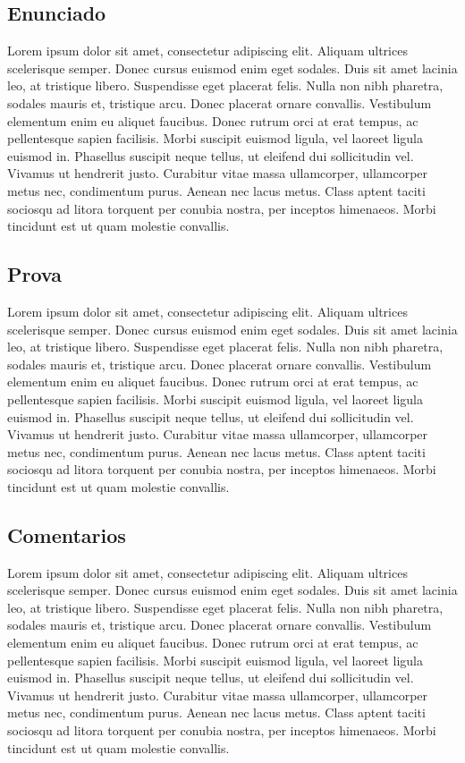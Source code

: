\documentclass[twoside]{article}
\begin{document}
\begin{multicols}{2}
\subsection{ Enunciado }
\indent Lorem ipsum dolor sit amet, consectetur adipiscing elit. Aliquam ultrices scelerisque semper. Donec cursus euismod enim eget sodales. Duis sit amet lacinia leo, at tristique libero. Suspendisse eget placerat felis. Nulla non nibh pharetra, sodales mauris et, tristique arcu. Donec placerat ornare convallis. Vestibulum elementum enim eu aliquet faucibus. Donec rutrum orci at erat tempus, ac pellentesque sapien facilisis. Morbi suscipit euismod ligula, vel laoreet ligula euismod in. Phasellus suscipit neque tellus, ut eleifend dui sollicitudin vel. Vivamus ut hendrerit justo. Curabitur vitae massa ullamcorper, ullamcorper metus nec, condimentum purus. Aenean nec lacus metus. Class aptent taciti sociosqu ad litora torquent per conubia nostra, per inceptos himenaeos. Morbi tincidunt est ut quam molestie convallis.



\subsection{ Prova }
\indent Lorem ipsum dolor sit amet, consectetur adipiscing elit. Aliquam ultrices scelerisque semper. Donec cursus euismod enim eget sodales. Duis sit amet lacinia leo, at tristique libero. Suspendisse eget placerat felis. Nulla non nibh pharetra, sodales mauris et, tristique arcu. Donec placerat ornare convallis. Vestibulum elementum enim eu aliquet faucibus. Donec rutrum orci at erat tempus, ac pellentesque sapien facilisis. Morbi suscipit euismod ligula, vel laoreet ligula euismod in. Phasellus suscipit neque tellus, ut eleifend dui sollicitudin vel. Vivamus ut hendrerit justo. Curabitur vitae massa ullamcorper, ullamcorper metus nec, condimentum purus. Aenean nec lacus metus. Class aptent taciti sociosqu ad litora torquent per conubia nostra, per inceptos himenaeos. Morbi tincidunt est ut quam molestie convallis.



\subsection{ Comentarios }
\indent Lorem ipsum dolor sit amet, consectetur adipiscing elit. Aliquam ultrices scelerisque semper. Donec cursus euismod enim eget sodales. Duis sit amet lacinia leo, at tristique libero. Suspendisse eget placerat felis. Nulla non nibh pharetra, sodales mauris et, tristique arcu. Donec placerat ornare convallis. Vestibulum elementum enim eu aliquet faucibus. Donec rutrum orci at erat tempus, ac pellentesque sapien facilisis. Morbi suscipit euismod ligula, vel laoreet ligula euismod in. Phasellus suscipit neque tellus, ut eleifend dui sollicitudin vel. Vivamus ut hendrerit justo. Curabitur vitae massa ullamcorper, ullamcorper metus nec, condimentum purus. Aenean nec lacus metus. Class aptent taciti sociosqu ad litora torquent per conubia nostra, per inceptos himenaeos. Morbi tincidunt est ut quam molestie convallis.




\end{multicols}
\end{document}
